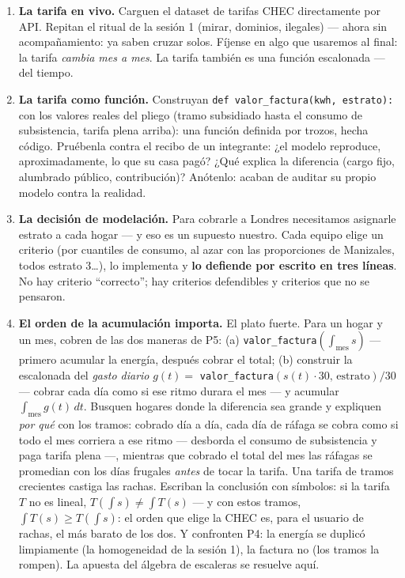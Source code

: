 \documentclass[12pt,letterpaper]{article}
\begin{document}
\begin{enumerate}[label=\arabic*.]
    \item \textbf{La tarifa en vivo.} Carguen el dataset de tarifas CHEC directamente por API. Repitan el ritual de la sesión 1 (mirar, dominios, ilegales) --- ahora sin acompañamiento: ya saben cruzar solos. Fíjense en algo que usaremos al final: la tarifa \emph{cambia mes a mes}. La tarifa también es una función escalonada --- del tiempo.
    \item \textbf{La tarifa como función.} Construyan \texttt{def valor\_factura(kwh, estrato):} con los valores reales del pliego (tramo subsidiado hasta el consumo de subsistencia, tarifa plena arriba): una función definida por trozos, hecha código. Pruébenla contra el recibo de un integrante: ¿el modelo reproduce, aproximadamente, lo que su casa pagó? ¿Qué explica la diferencia (cargo fijo, alumbrado público, contribución)? Anótenlo: acaban de auditar su propio modelo contra la realidad.
    \item \textbf{La decisión de modelación.} Para cobrarle a Londres necesitamos asignarle estrato a cada hogar --- y eso es un supuesto nuestro. Cada equipo elige un criterio (por cuantiles de consumo, al azar con las proporciones de Manizales, todos estrato 3\ldots), lo implementa y \textbf{lo defiende por escrito en tres líneas}. No hay criterio ``correcto''; hay criterios defendibles y criterios que no se pensaron.
    \item \textbf{El orden de la acumulación importa.} El plato fuerte. Para un hogar y un mes, cobren de las dos maneras de P5: (a) \texttt{valor\_factura}$\left(\int_{\text{mes}} s\right)$ --- primero acumular la energía, después cobrar el total; (b) construir la escalonada del \emph{gasto diario} $g(t)=$ \texttt{valor\_factura}$(s(t)\cdot 30,\,\text{estrato})/30$ --- cobrar cada día como si ese ritmo durara el mes --- y acumular $\int_{\text{mes}} g(t)\,dt$. Busquen hogares donde la diferencia sea grande y expliquen \emph{por qué} con los tramos: cobrado día a día, cada día de ráfaga se cobra como si todo el mes corriera a ese ritmo --- desborda el consumo de subsistencia y paga tarifa plena ---, mientras que cobrado el total del mes las ráfagas se promedian con los días frugales \emph{antes} de tocar la tarifa. Una tarifa de tramos crecientes castiga las rachas. Escriban la conclusión con símbolos: si la tarifa $T$ no es lineal, $T\!\left(\int s\right) \neq \int T(s)$ --- y con estos tramos, $\int T(s) \geq T\!\left(\int s\right)$: el orden que elige la CHEC es, para el usuario de rachas, el más barato de los dos. Y confronten P4: la energía se duplicó limpiamente (la homogeneidad de la sesión 1), la factura no (los tramos la rompen). La apuesta del álgebra de escaleras se resuelve aquí.

\end{enumerate}
\end{document}
